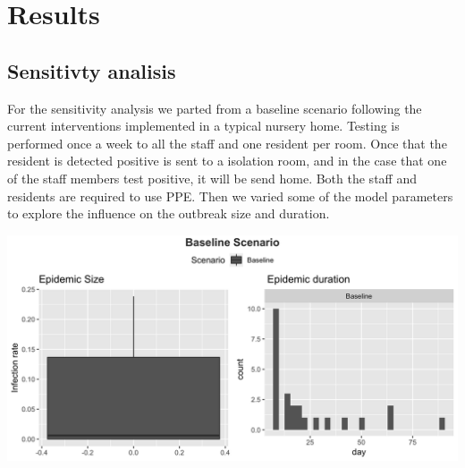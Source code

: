 \documentclass[
]{article}
\begin{document}
\hypertarget{results}{%
\section{Results}\label{results}}

\hypertarget{sensitivty-analisis}{%
\subsection{Sensitivty analisis}\label{sensitivty-analisis}}

For the sensitivity analysis we parted from a baseline scenario
following the current interventions implemented in a typical nursery
home. Testing is performed once a week to all the staff and one resident
per room. Once that the resident is detected positive is sent to a
isolation room, and in the case that one of the staff members test
positive, it will be send home. Both the staff and residents are
required to use PPE. Then we varied some of the model parameters to
explore the influence on the outbreak size and duration.

\includegraphics{Figures/SensitivityAnalysis/Baseline}
\end{document}
